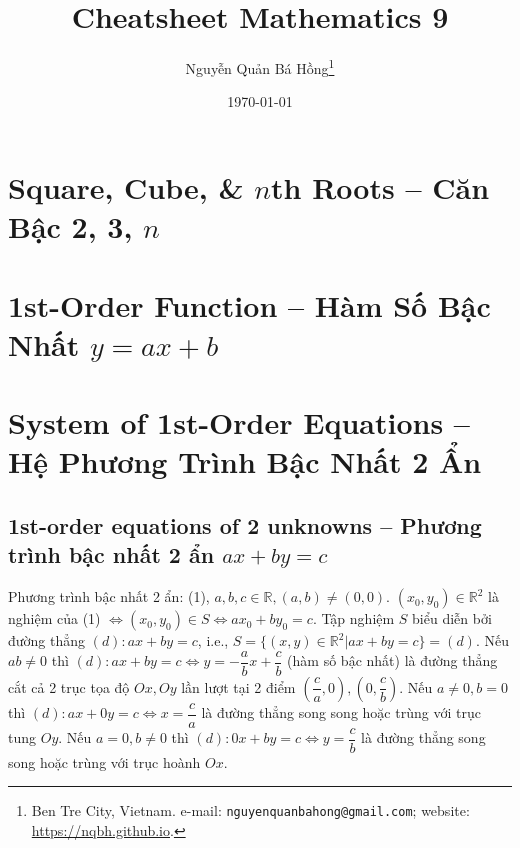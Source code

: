 \documentclass{article}
\title{Cheatsheet Mathematics 9}
\author{Nguyễn Quản Bá Hồng\footnote{Ben Tre City, Vietnam. e-mail: \texttt{nguyenquanbahong@gmail.com}; website: \url{https://nqbh.github.io}.}}
\date{\today}
\begin{document}
\maketitle
\tableofcontents


\section{Square, Cube, \& $n$th Roots -- Căn Bậc 2, 3, $n$}


\section{1st-Order Function -- Hàm Số Bậc Nhất $y = ax + b$}


\section{System of 1st-Order Equations -- Hệ Phương Trình Bậc Nhất 2 Ẩn}

\subsection{1st-order equations of 2 unknowns -- Phương trình bậc nhất 2 ẩn $ax + by = c$}
 Phương trình bậc nhất 2 ẩn:  (1), $a,b,c\in\mathbb{R},(a,b)\ne(0,0)$.  $(x_0,y_0)\in\mathbb{R}^2$ là nghiệm của (1) $\Leftrightarrow(x_0,y_0)\in S\Leftrightarrow ax_0 + by_0 = c$.  Tập nghiệm $S$ biểu diễn bởi đường thẳng $(d):ax + by = c$, i.e., $S = \{(x,y)\in\mathbb{R}^2|ax + by = c\} = (d)$.  Nếu $ab\ne0$ thì $(d):ax + by = c\Leftrightarrow y = -\dfrac{a}{b}x + \dfrac{c}{b}$ (hàm số bậc nhất) là đường thẳng cắt cả 2 trục tọa độ $Ox,Oy$ lần lượt tại 2 điểm $\left(\dfrac{c}{a},0\right),\left(0,\dfrac{c}{b}\right)$.  Nếu $a\ne0,b = 0$ thì $(d):ax + 0y = c\Leftrightarrow x = \dfrac{c}{a}$ là đường thẳng song song hoặc trùng với trục tung $Oy$.  Nếu $a = 0,b\ne0$ thì $(d):0x + by = c\Leftrightarrow y = \dfrac{c}{b}$ là đường thẳng song song hoặc trùng với trục hoành $Ox$.
\end{document}
